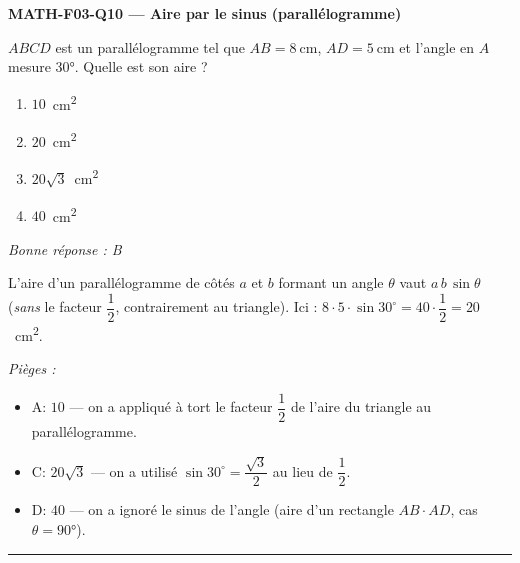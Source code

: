 \documentclass[11pt,a4paper]{article}
\begin{document}
\noindent\textbf{MATH-F03-Q10 --- Aire par le sinus (parallélogramme)}\par
$ABCD$ est un parallélogramme tel que $AB=\qty{8}{\centi\metre}$, $AD=\qty{5}{\centi\metre}$ et l'angle en $A$ mesure \ang{30}. Quelle est son aire ?
\begin{enumerate}[label=\Alph*)]
\item $10$~\si{\centi\metre\squared}
\item $20$~\si{\centi\metre\squared}
\item $20\sqrt{3}$~\si{\centi\metre\squared}
\item $40$~\si{\centi\metre\squared}
\end{enumerate}
\textit{Bonne réponse : B}\par
L'aire d'un parallélogramme de côtés $a$ et $b$ formant un angle $\theta$ vaut $a\,b\,\sin\theta$ (\emph{sans} le facteur $\dfrac12$, contrairement au triangle). Ici : $8\cdot5\cdot\sin 30^\circ=40\cdot\dfrac12=20$~\si{\centi\metre\squared}.\par
\textit{Pièges :}
\begin{itemize}
\item A: $10$ --- on a appliqué à tort le facteur $\dfrac12$ de l'aire du triangle au parallélogramme.
\item C: $20\sqrt3$ --- on a utilisé $\sin 30^\circ=\dfrac{\sqrt3}{2}$ au lieu de $\dfrac12$.
\item D: $40$ --- on a ignoré le sinus de l'angle (aire d'un rectangle $AB\cdot AD$, cas $\theta=\ang{90}$).
\end{itemize}
\vspace{8pt}\hrule\vspace{8pt}
\end{document}
